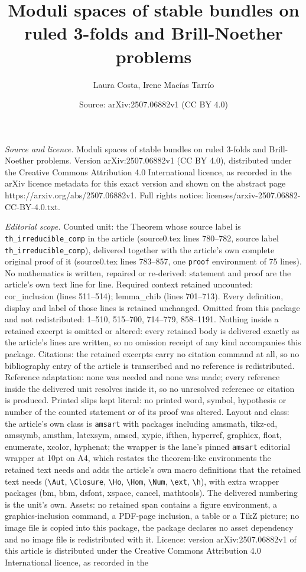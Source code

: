 \documentclass[10pt,a4paper]{amsart}
\title[Moduli spaces of stable bundles on ruled 3-folds and Brill-N]{Moduli spaces of stable bundles on ruled 3-folds and Brill-Noether problems}
\author{Laura Costa, Irene Mac\'ias Tarr\'io}
\date{Source: arXiv:2507.06882v1 (CC BY 4.0)}
\begin{document}
\maketitle

\noindent\emph{Source and licence.} Moduli spaces of stable bundles on ruled 3-folds and Brill-Noether problems. Version arXiv:2507.06882v1 (CC BY 4.0), distributed under the Creative Commons Attribution 4.0 International licence, as recorded in the arXiv licence metadata for this exact version and shown on the abstract page https://arxiv.org/abs/2507.06882v1. Full rights notice: licenses/arxiv-2507.06882-CC-BY-4.0.txt.\par\smallskip

\noindent\textit{Editorial scope.} Counted unit: the Theorem whose source label is \texttt{th\_irreducible\_comp} in the article (source0.tex lines 780--782, source label \texttt{th\_irreducible\_comp}), delivered together with the article's own complete original proof of it (source0.tex lines 783--857, one \texttt{proof} environment of 75 lines). No mathematics is written, repaired or re-derived: statement and proof are the article's own text line for line. Required context retained uncounted: cor\_inclusion (lines 511--514); lemma\_chib (lines 701--713). Every definition, display and label of those lines is retained unchanged. Omitted from this package and not redistributed: 1--510, 515--700, 714--779, 858--1191. Nothing inside a retained excerpt is omitted or altered: every retained body is delivered exactly as the article's lines are written, so no omission receipt of any kind accompanies this package. Citations: the retained excerpts carry no citation command at all, so no bibliography entry of the article is transcribed and no reference is redistributed. Reference adaptation: none was needed and none was made; every reference inside the delivered unit resolves inside it, so no unresolved reference or citation is produced. Printed slips kept literal: no printed word, symbol, hypothesis or number of the counted statement or of its proof was altered. Layout and class: the article's own class is \texttt{amsart} with packages including amsmath, tikz-cd, amssymb, amsthm, latexsym, amscd, xypic, ifthen, hyperref, graphicx, float, enumerate, xcolor, hyphenat; the wrapper is the lane's pinned \texttt{amsart} editorial wrapper at 10pt on A4, which restates the theorem-like environments the retained text needs and adds the article's own macro definitions that the retained text needs (\texttt{\textbackslash Aut}, \texttt{\textbackslash Closure}, \texttt{\textbackslash Ho}, \texttt{\textbackslash Hom}, \texttt{\textbackslash Num}, \texttt{\textbackslash ext}, \texttt{\textbackslash h}), with extra wrapper packages (bm, bbm, dsfont, xspace, cancel, mathtools). The delivered numbering is the unit's own. Assets: no retained span contains a figure environment, a graphics-inclusion command, a PDF-page inclusion, a table or a TikZ picture; no image file is copied into this package, the package declares no asset dependency and no image file is redistributed with it. Licence: version arXiv:2507.06882v1 of this article is distributed under the Creative Commons Attribution 4.0 International licence, as recorded in the 
\end{document}
